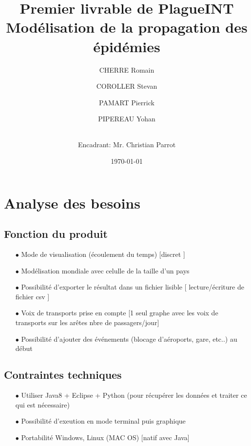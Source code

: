 \documentclass[12pt,a4paper]{report}
\title{Premier livrable de PlagueINT \\ \large Modélisation de la propagation des épidémies}
\date{\today}
\author{
CHERRE Romain
\and COROLLER Stevan 
\and PAMART Pierrick
\and PIPEREAU Yohan
\and \\
Encadrant: Mr. Christian Parrot }
\begin{document}
\maketitle

\tableofcontents

\section*{Analyse des besoins}

\subsection*{Fonction du produit}
\begin{flushleft}
  \begin{itemize}
	\item[$\bullet$] Mode de visualisation (écoulement du temps) [discret ]
	\item[$\bullet$] Modélisation mondiale avec celulle de la taille d'un pays
	\item[$\bullet$] Possibilité d'exporter le résultat dans un fichier lisible [ lecture/écriture de fichier csv ]
	\item[$\bullet$] Voix de transports prise en compte [1 seul graphe avec les voix de transports sur les arêtes nbre de passagers/jour]
	\item[$\bullet$] Possibilité d'ajouter des événements (blocage d'aéroports, gare, etc..) au début
  \end{itemize}
\end{flushleft}

\subsection*{Contraintes techniques}
\begin{flushleft}
  \begin{itemize}
	\item[$\bullet$] Utiliser Java8 + Eclipse + Python (pour récupérer les données et traiter ce qui est nécessaire)
	\item[$\bullet$] Possibilité d'exeution en mode terminal puis graphique
	\item[$\bullet$] Portabilité Windows, Linux (MAC OS) [natif avec Java]
    \end{itemize}
\end{flushleft}
\end{document}
